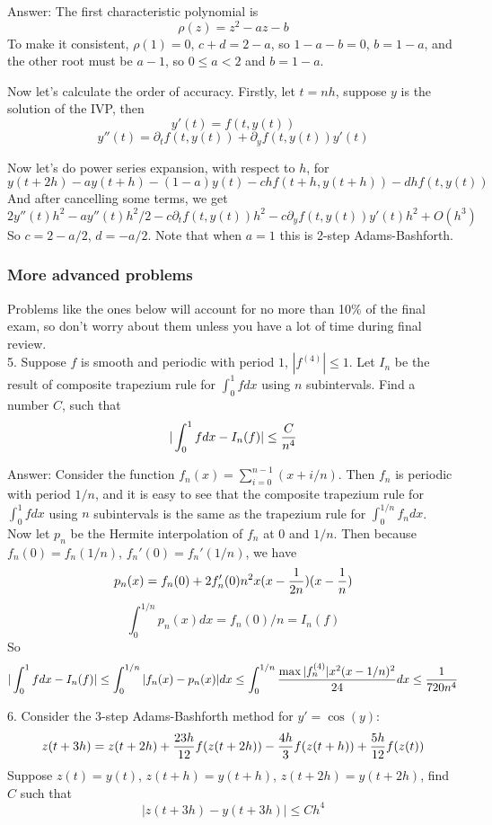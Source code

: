 \documentclass[20pt]{article} %
\theoremstyle{break}
\begin{document}
Answer: The first characteristic polynomial is
\[\rho(z)=z^2-az-b\]
To make it consistent, $\rho(1)=0$, $c+d=2-a$, so $1-a-b=0$, $b=1-a$, and the other root must be $a-1$, so $0\leq a<2$ and $b=1-a$.

Now let's calculate the order of accuracy. Firstly, let $t=nh$, suppose $y$ is the solution of the IVP, then
\[y'(t)=f(t, y(t))\]
\[y''(t)=\partial_tf(t, y(t))+\partial_yf(t, y(t))y'(t)\]

Now let's do power series expansion, with respect to $h$, for
\[y(t+2h)-ay(t+h)-(1-a)y(t)-chf(t+h, y(t+h))-dhf(t, y(t))\]
And after cancelling some terms, we get
\[2y''(t)h^2-ay''(t)h^2/2-c\partial_t f(t, y(t))h^2-c\partial_y f(t, y(t))y'(t)h^2+O(h^3)\]
So $c=2-a/2$, $d=-a/2$. Note that when $a=1$ this is 2-step Adams-Bashforth.\\


\subsubsection{More advanced problems}

Problems like the ones below will account for no more than 10\% of the final exam, so don't worry about them unless you have a lot of time during final review.\\

5. Suppose $f$ is smooth and periodic with period $1$, $|f^{(4)}|\leq 1$. Let $I_n$ be the result of composite trapezium rule for $\int_0^1fdx$ using $n$ subintervals. Find a number $C$, such that
\[|\int_0^1fdx-I_n(f)|\leq {C\over n^4}\]

Answer: Consider the function $f_n(x)=\sum_{i=0}^{n-1}(x+i/n)$. Then $f_n$ is periodic with period $1/n$, and it is easy to see that the composite trapezium rule for $\int_0^1fdx$ using $n$ subintervals is the same as the trapezium rule for $\int_0^{1/n}f_ndx$.\\

Now let $p_n$ be the Hermite interpolation of $f_n$ at $0$ and $1/n$. Then because $f_n(0)=f_n(1/n)$, $f_n'(0)=f_n'(1/n)$, we have
\[p_n(x)=f_n(0)+2f'_n(0)n^2x(x-{1\over 2n})(x-{1\over n})\]
\[\int_0^{1/n}p_n(x)dx=f_n(0)/n=I_n(f)\]
So
\[|\int_0^1fdx-I_n(f)|\leq \int_0^{1/n}|f_n(x)-p_n(x)|dx\leq \int_0^{1/n}{\max|f_n^{(4)}|x^2(x-1/n)^2\over 24}dx\leq {1\over 720n^4}\]

6. Consider the 3-step Adams-Bashforth method for $y'=\cos(y)$:
\[z(t+3h)=z(t+2h)+{23h\over 12}f(z(t+2h))-{4h\over 3}f(z(t+h))+{5h\over 12}f(z(t))\]
Suppose $z(t)=y(t)$, $z(t+h)=y(t+h)$, $z(t+2h)=y(t+2h)$, find $C$ such that
\[|z(t+3h)-y(t+3h)|\leq Ch^4\]
\end{document}
